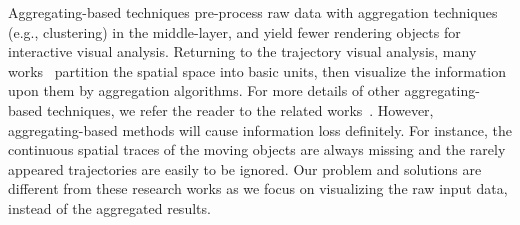 {Aggregating-based techniques pre-process raw data with aggregation techniques (e.g., clustering) in the middle-layer, and yield fewer rendering objects for interactive visual analysis.}
Returning to the trajectory visual analysis,
many works~\cite{wood2010visualisation,guo2009flow,von2015mobilitygraphs} partition the {spatial space} into basic units,
then visualize the information upon them by aggregation algorithms.
For more details of other aggregating-based techniques, we refer the reader to the related works~\cite{andrienko2008spatio,adrienko2010spatial}.
However, aggregating-based methods will cause information loss definitely.
For instance, the continuous spatial traces of the moving objects are always missing and the rarely appeared trajectories are easily to be ignored.
Our problem and solutions are different from these research works as we focus on visualizing the raw input data, instead of the aggregated results.


